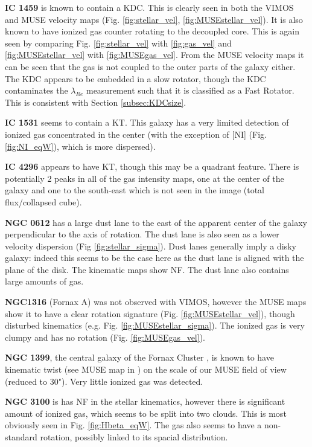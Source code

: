 		\textbf{IC 1459} is known to contain a KDC. This is clearly seen in both the VIMOS and MUSE velocity maps (Fig. \ref{fig:stellar_vel}, \ref{fig:MUSEstellar_vel}). It is also known to have ionized gas counter rotating to the decoupled core. This is again seen by comparing Fig. \ref{fig:stellar_vel} with \ref{fig:gas_vel} and \ref{fig:MUSEstellar_vel} with \ref{fig:MUSEgas_vel}. From the MUSE velocity maps it can be seen that the gas is not coupled to the outer parts of the galaxy either. The KDC appears to be embedded in a slow rotator, though the KDC contaminates the $\lambda_{Re}$ measurement such that it is classified as a Fast Rotator. This is consistent with Section \ref{subsec:KDCsize}.

		\textbf{IC 1531} seems to contain a KT. This galaxy has a very limited detection of ionized gas concentrated in the center (with the exception of [NI] (Fig. \ref{fig:NI_eqW}), which is more dispersed).

		\textbf{IC 4296} appears to have KT, though this may be a quadrant feature. There is potentially 2 peaks in all of the gas intensity maps, one at the center of the galaxy and one to the south-east which is not seen in the image (total flux/collapsed cube).

		\textbf{NGC 0612} has a large dust lane to the east of the apparent center of the galaxy perpendicular to the axis of rotation. The dust lane is also seen as a lower velocity dispersion (Fig \ref{fig:stellar_sigma}). Dust lanes generally imply a disky galaxy: indeed this seems to be the case here as the dust lane is aligned with the plane of the disk. The kinematic maps show NF. The dust lane also contains large amounts of gas. 

		\textbf{NGC1316} (Fornax A) was not observed with VIMOS, however the MUSE maps show it to have a clear rotation signature (Fig. \ref{fig:MUSEstellar_vel}), though disturbed kinematics (e.g. Fig. \ref{fig:MUSEstellar_sigma}). The ionized gas is very clumpy and has no rotation (Fig. \ref{fig:MUSEgas_vel}).

		\textbf{NGC 1399}, the central galaxy of the Fornax Cluster \citep{Jordan2007}, is known to have kinematic twist (see MUSE map in \citet{Zieleniewski2017}) on the scale of our MUSE field of view (reduced to 30"). Very little ionized gas was detected. 

		\textbf{NGC 3100} is has NF in the stellar kinematics, however there is significant amount of ionized gas, which seems to be split into two clouds. This is most obviously seen in Fig. \ref{fig:Hbeta_eqW}. The gas also seems to have a non-standard rotation, possibly linked to its spacial distribution. 

